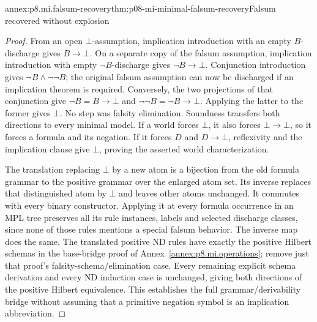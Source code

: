 \begin{annexitem}{annex:p8.mi.falsum-recovery}{thm:p08-mi-minimal-falsum-recovery}{Falsum recovered without explosion}
\begin{proof}
From an open \(\bot\)-assumption, implication introduction with an
empty \(B\)-discharge gives \(B\to\bot\). On a separate copy of
the falsum assumption, implication introduction with empty \(\neg B\)-discharge gives
\(\neg B\to\bot\). Conjunction introduction gives
\(\neg B\land\neg\neg B\); the original falsum assumption
can now be discharged if an implication theorem is required.
Conversely, the two projections of that conjunction give
\(\neg B=B\to\bot\) and \(\neg\neg B=\neg B\to\bot\).
Applying the latter to the former gives \(\bot\). No step was
falsity elimination. Soundness transfers both directions to every
minimal model. If a world forces \(\bot\), it also forces
\(\bot\to\bot\), so it forces a formula and its negation.
If it forces \(D\) and \(D\to\bot\), reflexivity and the
implication clause give \(\bot\), proving the asserted world
characterization.

The translation replacing \(\bot\) by a new atom is a bijection
from the old formula grammar to the positive grammar over the enlarged
atom set. Its inverse replaces that distinguished atom by \(\bot\)
and leaves other atoms unchanged. It commutes with every binary constructor.
Applying it at every formula occurrence in an MPL tree preserves
all its rule instances, labels and selected discharge classes, since
none of those rules mentions a special falsum behavior. The inverse
map does the same. The translated positive ND rules have exactly
the positive Hilbert schemas in the base-bridge proof of
Annex~\ref{annex:p8.mi.operations}; remove just that proof's
falsity-schema/elimination case. Every remaining explicit schema
derivation and every ND induction case is unchanged, giving both
directions of the positive Hilbert equivalence. This establishes the
full grammar/derivability bridge without assuming that a primitive
negation symbol is an implication abbreviation.
\end{proof}
\end{annexitem}

